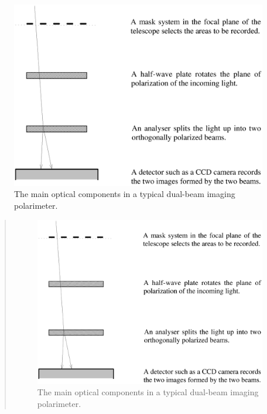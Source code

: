 \begin{latexonly}
  \begin{figure}[htb]
  \begin{center}
  \includegraphics[scale=0.5]{sun223_figures/optical.eps}
  \caption{The main optical components in a typical dual-beam imaging polarimeter.}
  \label{fig:optical}
  \end{center}
  \end{figure}
\end{latexonly}
\begin{htmlonly}
   \begin{quote}
   \begin{figure}[bhtp]
   \label{fig:optical}
   \includegraphics[scale=0.8,width=8in]{sun223_figures/optical.eps}
   \caption{The main optical components in a typical dual-beam imaging polarimeter.}
   \end{figure}
   \end{quote}
\end{htmlonly}

